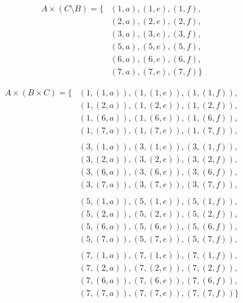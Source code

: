 \documentclass{article}
\begin{document}
\begin{outline}[enumerate]
        \2 \begin{equation*}
            \begin{split}
            A \times (C \setminus B) = \{& (1, a), (1, e), (1, f), \\
                & (2, a), (2, e), (2, f), \\
                & (3, a), (3, e), (3, f), \\
                & (5, a), (5, e), (5, f), \\
                & (6, a), (6, e), (6, f), \\
                & (7, a), (7, e), (7, f) \}
            \end{split}
        \end{equation*}
        
        \2 \begin{equation*}
            \begin{split}
                A \times (B \times C) = \{ & (1, (1, a)), (1, (1, e)), (1, (1, f)), \\
            & (1, (2, a)), (1, (2, e)), (1, (2, f)), \\
            & (1, (6, a)), (1, (6, e)), (1, (6, f)), \\
            & (1, (7, a)), (1, (7, e)), (1, (7, f)), \\
            & \\
            & (3, (1, a)), (3, (1, e)), (3, (1, f)), \\
            & (3, (2, a)), (3, (2, e)), (3, (2, f)), \\
            & (3, (6, a)), (3, (6, e)), (3, (6, f)), \\
            & (3, (7, a)), (3, (7, e)), (3, (7, f)), \\
            & \\
            & (5, (1, a)), (5, (1, e)), (5, (1, f)), \\
            & (5, (2, a)), (5, (2, e)), (5, (2, f)), \\
            & (5, (6, a)), (5, (6, e)), (5, (6, f)), \\
            & (5, (7, a)), (5, (7, e)), (5, (7, f)), \\
            & \\
            & (7, (1, a)), (7, (1, e)), (7, (1, f)), \\
            & (7, (2, a)), (7, (2, e)), (7, (2, f)), \\
            & (7, (6, a)), (7, (6, e)), (7, (6, f)), \\
            & (7, (7, a)), (7, (7, e)), (7, (7, f)) \} 
            \end{split}
        \end{equation*}


\end{outline}
\end{document}
